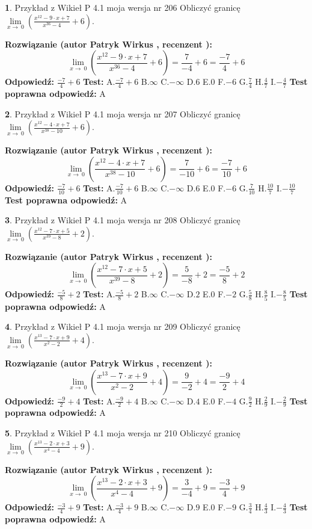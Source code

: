 \documentclass[12pt, a4paper]{article}
\theoremstyle{definition} %
\newtheorem{zad}{}
\newcommand{\zadStart}[1]{\begin{zad}#1\newline}
\newcommand{\zadStop}{\end{zad}}
\newcommand{\rozwStart}[2]{\noindent \textbf{Rozwiązanie (autor #1 , recenzent #2): }\newline}
\newcommand{\rozwStop}{\newline}
\newcommand{\odpStart}{\noindent \textbf{Odpowiedź:}\newline}
\newcommand{\odpStop}{\newline}
\newcommand{\testStart}{\noindent \textbf{Test:}\newline}
\newcommand{\testStop}{\newline}
\newcommand{\kluczStart}{\noindent \textbf{Test poprawna odpowiedź:}\newline}
\newcommand{\kluczStop}{\newline}
\begin{document}
\zadStart{Przykład z Wikieł P 4.1 moja wersja nr 206}
Obliczyć granicę $\lim\limits_{x\to\ 0}(\frac{x^{12}-9 \cdot x +7}{x^{36}-4}+6)$.
\zadStop
\rozwStart{Patryk Wirkus}{}
$$\lim\limits_{x\to\ 0}(\frac{x^{12}-9 \cdot x +7}{x^{36}-4}+6)=\frac{7}{-4}+6=\frac{-7}{4}+6$$
\rozwStop
\odpStart
$\frac{-7}{4}+6$
\odpStop
\testStart
A.$\frac{-7}{4}+6$
B.$\infty$
C.$-\infty$
D.$6$
E.$0$
F.$-6$
G.$\frac{7}{4}$
H.$\frac{4}{7}$
I.$-\frac{4}{7}$
\testStop
\kluczStart
A
\kluczStop



\zadStart{Przykład z Wikieł P 4.1 moja wersja nr 207}
Obliczyć granicę $\lim\limits_{x\to\ 0}(\frac{x^{12}-4 \cdot x +7}{x^{38}-10}+6)$.
\zadStop
\rozwStart{Patryk Wirkus}{}
$$\lim\limits_{x\to\ 0}(\frac{x^{12}-4 \cdot x +7}{x^{38}-10}+6)=\frac{7}{-10}+6=\frac{-7}{10}+6$$
\rozwStop
\odpStart
$\frac{-7}{10}+6$
\odpStop
\testStart
A.$\frac{-7}{10}+6$
B.$\infty$
C.$-\infty$
D.$6$
E.$0$
F.$-6$
G.$\frac{7}{10}$
H.$\frac{10}{7}$
I.$-\frac{10}{7}$
\testStop
\kluczStart
A
\kluczStop



\zadStart{Przykład z Wikieł P 4.1 moja wersja nr 208}
Obliczyć granicę $\lim\limits_{x\to\ 0}(\frac{x^{12}-7 \cdot x +5}{x^{39}-8}+2)$.
\zadStop
\rozwStart{Patryk Wirkus}{}
$$\lim\limits_{x\to\ 0}(\frac{x^{12}-7 \cdot x +5}{x^{39}-8}+2)=\frac{5}{-8}+2=\frac{-5}{8}+2$$
\rozwStop
\odpStart
$\frac{-5}{8}+2$
\odpStop
\testStart
A.$\frac{-5}{8}+2$
B.$\infty$
C.$-\infty$
D.$2$
E.$0$
F.$-2$
G.$\frac{5}{8}$
H.$\frac{8}{5}$
I.$-\frac{8}{5}$
\testStop
\kluczStart
A
\kluczStop



\zadStart{Przykład z Wikieł P 4.1 moja wersja nr 209}
Obliczyć granicę $\lim\limits_{x\to\ 0}(\frac{x^{13}-7 \cdot x +9}{x^{2}-2}+4)$.
\zadStop
\rozwStart{Patryk Wirkus}{}
$$\lim\limits_{x\to\ 0}(\frac{x^{13}-7 \cdot x +9}{x^{2}-2}+4)=\frac{9}{-2}+4=\frac{-9}{2}+4$$
\rozwStop
\odpStart
$\frac{-9}{2}+4$
\odpStop
\testStart
A.$\frac{-9}{2}+4$
B.$\infty$
C.$-\infty$
D.$4$
E.$0$
F.$-4$
G.$\frac{9}{2}$
H.$\frac{2}{9}$
I.$-\frac{2}{9}$
\testStop
\kluczStart
A
\kluczStop



\zadStart{Przykład z Wikieł P 4.1 moja wersja nr 210}
Obliczyć granicę $\lim\limits_{x\to\ 0}(\frac{x^{13}-2 \cdot x +3}{x^{4}-4}+9)$.
\zadStop
\rozwStart{Patryk Wirkus}{}
$$\lim\limits_{x\to\ 0}(\frac{x^{13}-2 \cdot x +3}{x^{4}-4}+9)=\frac{3}{-4}+9=\frac{-3}{4}+9$$
\rozwStop
\odpStart
$\frac{-3}{4}+9$
\odpStop
\testStart
A.$\frac{-3}{4}+9$
B.$\infty$
C.$-\infty$
D.$9$
E.$0$
F.$-9$
G.$\frac{3}{4}$
H.$\frac{4}{3}$
I.$-\frac{4}{3}$
\testStop
\kluczStart
A
\kluczStop
\end{document}
